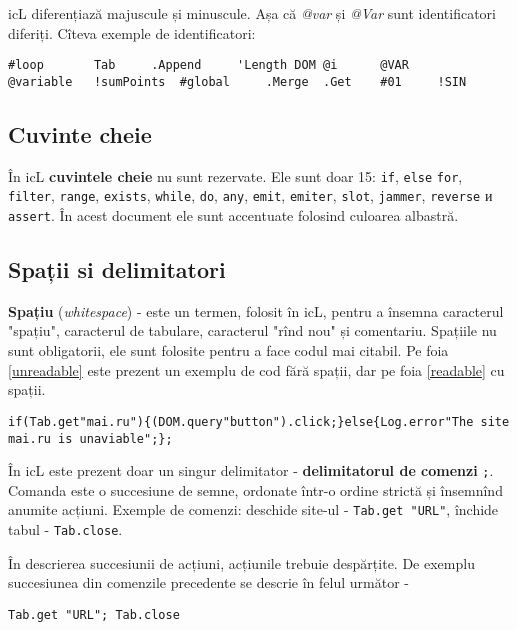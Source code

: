 icL diferențiază majuscule și minuscule. Așa că \textit{@var} și \textit{@Var} sunt identificatori diferiți. Cîteva exemple de identificatori:

\begin{lstlisting}[numbers=none]
#loop		Tab		.Append		'Length	DOM	@i	 	@VAR
@variable	!sumPoints	#global		.Merge	.Get	#01		!SIN
\end{lstlisting}

\subsection{Cuvinte cheie}

În icL \textbf{cuvintele cheie} nu sunt rezervate. Ele sunt doar 15: \lstinline`if`, \lstinline|else| \lstinline`for`, \lstinline`filter`, \lstinline`range`, \lstinline`exists`, \lstinline`while`, \lstinline`do`, \lstinline`any`, \lstinline`emit`, \lstinline`emiter`, \lstinline`slot`, \lstinline|jammer|, \lstinline|reverse| и \lstinline|assert|. În acest document ele sunt accentuate folosind culoarea albastră.

\subsection{Spații si delimitatori}

\textbf{Spațiu} (\textit{whitespace}) - este un termen, folosit în icL, pentru a însemna caracterul "spațiu", caracterul de tabulare, caracterul "rînd nou" și comentariu. Spațiile nu sunt obligatorii, ele sunt folosite pentru a face codul mai citabil. Pe foia \ref{unreadable} este prezent un exemplu de cod fără spații, dar pe foia \ref{readable} cu spații.

\begin{lstlisting}[caption=Cod fără spații,label=unreadable]
if(Tab.get"mai.ru"){(DOM.query"button").click;}else{Log.error"The site mai.ru is unaviable";};
\end{lstlisting}

În icL este prezent doar un singur delimitator - \textbf{delimitatorul de comenzi} \lstinline`;`. Comanda este o succesiune de semne, ordonate într-o ordine strictă și însemnînd anumite acțiuni. Exemple de comenzi: deschide site-ul - \lstinline`Tab.get "URL"`, închide tabul - \lstinline`Tab.close`.

În descrierea succesiunii de acțiuni, acțiunile trebuie despărțite. De exemplu succesiunea din comenzile precedente se descrie în felul următor -
\begin{lstlisting}[numbers=none]
Tab.get "URL"; Tab.close
\end{lstlisting}

